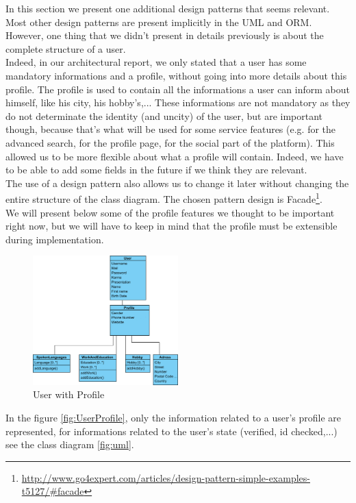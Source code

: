 In this section we present one additional design patterns that seems relevant.\\

Most other design patterns are present implicitly in the UML and ORM.
However, one thing that we didn't present in details previously is about the complete structure of a user.\\
Indeed, in our architectural report, we only stated that a user has some mandatory informations and a profile, without going into more details about this profile. The profile is used to contain all the informations a user can inform about himself, like his city, his hobby's,... These informations are not mandatory as they do not determinate the identity (and uncity) of the user, but are important though, because that's what will be used for some service features (e.g. for the advanced search, for the profile page, for the social part of the platform). This allowed us to be more flexible about what a profile will contain. Indeed, we have to be able to add some fields in the future if we think they are relevant.\\

The use of a design pattern also allows us to change it later without changing the entire structure of the class diagram. The chosen pattern design is Facade\footnote{\url{http://www.go4expert.com/articles/design-pattern-simple-examples-t5127/\#facade}}.\\
We will present below some of the profile features we thought to be important right now, but we will have to keep in mind that the profile must be extensible during implementation.

\begin{figure}[H]
  \centering
  \includegraphics[width=0.5\textwidth]{userprofile.png}
  \caption{User with Profile}
  \label{fig:UserProfile}
\end{figure}

In the figure \vref{fig:UserProfile}, only the information related to a user's profile are represented, for informations related to the user's state (verified, id checked,...) see the class diagram \vref{fig:uml}.

